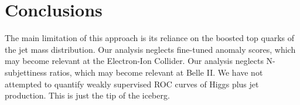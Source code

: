 \section{Conclusions}\label{sec:conclusions}

The main limitation of this approach is its reliance on the boosted top
quarks of the jet mass distribution. Our analysis neglects fine-tuned
anomaly scores, which may become relevant at the Electron-Ion Collider.
Our analysis neglects N-subjettiness ratios, which may become relevant
at Belle II. We have not attempted to quantify weakly supervised ROC
curves of Higgs plus jet production. This is just the tip of the
iceberg.

